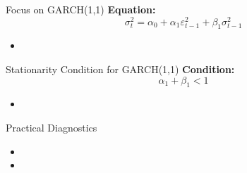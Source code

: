 \documentclass[aspectratio=169]{beamer}
\begin{document}
\begin{frame}{Focus on GARCH(1,1)}
\textbf{Equation:}
\[
\sigma_t^2 = \alpha_0 + \alpha_1 \varepsilon_{t-1}^2 + \beta_1 \sigma_{t-1}^2
\]

\begin{itemize}
    \item %
\end{itemize}
\end{frame}

\begin{frame}{Stationarity Condition for GARCH(1,1)}
\textbf{Condition:}
\[
\alpha_1 + \beta_1 < 1
\]

\begin{itemize}
    \item %
\end{itemize}
\end{frame}

\begin{frame}{Practical Diagnostics}
\begin{itemize}
    \item %
    \item %
\end{itemize}
\end{frame}
\end{document}
